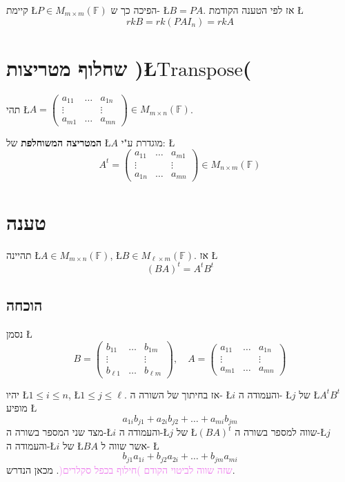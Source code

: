 \documentclass[english,hebrew]{article}
\begin{document}
קיימת \L{$P\in M_{m\times m}(\mathbb{F})$} הפיכה כך ש- \L{$B=PA$}.
אז לפי הטענה הקודמת \L{%
\[
rkB=rk(PAI_{n})=rkA
\]
}%

\section{שחלוף מטריצות )\L{$\text{Transpose}$}(}

תהי \L{$A=\begin{pmatrix}a_{11} & \dots & a_{1n}\\
\vdots &  & \vdots\\
a_{m1} & \dots & a_{mn}
\end{pmatrix}\in M_{m\times n}(\mathbb{F})$}.

\textbf{המטריצה המשוחלפת} של \L{$A$} מוגדרת ע"י: \L{%
\[
A^{t}=\begin{pmatrix}a_{11} & \dots & a_{m1}\\
\vdots &  & \vdots\\
a_{1n} & \dots & a_{mn}
\end{pmatrix}\in M_{n\times m}(\mathbb{F})
\]
}%

\section{טענה}

תהיינה \L{$A\in M_{m\times n}(\mathbb{F})$}, \L{$B\in M_{\ell\times m}(\mathbb{F})$}.
אז \L{%
\[
(BA)^{t}=A^{t}B^{t}
\]
}%

\subsection{הוכחה}

נסמן \L{%
\[
B=\begin{pmatrix}b_{11} & \dots & b_{1m}\\
\vdots &  & \vdots\\
b_{\ell1} & \dots & b_{\ell m}
\end{pmatrix},\quad A=\begin{pmatrix}a_{11} & \dots & a_{1n}\\
\vdots &  & \vdots\\
a_{m1} & \dots & a_{mn}
\end{pmatrix}
\]
}%

יהיו \L{$1\le i\le n$}, \L{$1\le j\le\ell$}. אז בחיתוך של השורה
ה- \L{$i$} והעמודה ה- \L{$j$} של \L{$A^{t}B^{t}$} מופיע \L{%
\[
a_{1i}b_{j1}+a_{2i}b_{j2}+\dots+a_{mi}b_{jm}
\]
}%
מצד שני המספר בשורה ה-\L{$i$} והעמודה ה-\L{$j$} של \L{$(BA)^{t}$}
שווה למספר בשורה ה-\L{$j$} והעמודה ה-\L{$i$} של \L{$BA$} אשר שווה
ל- \L{%
\[
b_{j1}a_{1i}+b_{j2}a_{2i}+\dots+b_{jm}a_{mi}
\]
}%
\textcolor{violet}{שזה שווה לביטוי הקודם )חילוף בכפל סקלרים(}. מכאן
הנדרש.
\end{document}
